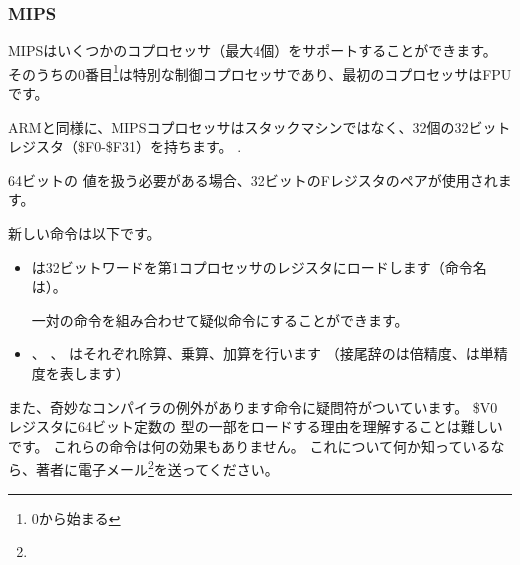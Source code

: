 ﻿\subsubsection{MIPS}

MIPSはいくつかのコプロセッサ（最大4個）をサポートすることができます。
そのうちの0番目\footnote{0から始まる}は特別な制御コプロセッサであり、最初のコプロセッサはFPUです。

ARMと同様に、MIPSコプロセッサはスタックマシンではなく、32個の32ビットレジスタ（\$F0-\$F31）を持ちます。
.

64ビットの \Tdouble 値を扱う必要がある場合、32ビットのFレジスタのペアが使用されます。



新しい命令は以下です。

\begin{itemize}

\item {}は32ビットワードを第1コプロセッサのレジスタにロードします（命令名は）。

一対の命令を組み合わせて疑似命令にすることができます。

\item {}、 、 はそれぞれ除算、乗算、加算を行います
（接尾辞のは倍精度、は単精度を表します）

\end{itemize}

\myindex{\CompilerAnomaly}
\label{MIPS_FPU_LUI}

また、奇妙なコンパイラの例外があります命令に疑問符がついています。 
\$V0 レジスタに64ビット定数の \Tdouble 型の一部をロードする理由を理解することは難しいです。 
これらの命令は何の効果もありません。 
これについて何か知っているなら、著者に電子メール\footnote{\EMAILS}を送ってください。
